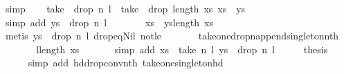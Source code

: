 \begin{isabellebody}
\ simp\isanewline
\ \ \isamarkupfalse%
\ {\isachardoublequoteopen}take\ {}\ {\isacharparenleft}drop\ n\ l{\isacharparenright}\ {\isacharequal}\ take\ {}\ {\isacharparenleft}drop\ {\isacharparenleft}length\ xs{\isacharparenright}\ {\isacharparenleft}xs\ {\isacharat}\ ys{\isacharparenright}{\isacharparenright}{\isachardoublequoteclose}\ \isamarkupfalse%
\ {}\ {}\ \isanewline
\ \ \ \ \isamarkupfalse%
\ {\isacharparenleft}simp\ add{\isacharcolon}\ {\isacharbackquoteopen}ys\ {\isacharequal}\ drop\ n\ l{\isacharbackquoteclose}{\isacharparenright}\isanewline
\ \ \isamarkupfalse%
\ \isamarkupfalse%
\ {\isachardoublequoteopen}{\isachardot}{\isachardot}{\isachardot}\ {\isacharequal}\ {\isacharbrackleft}{\isacharparenleft}xs\ {\isacharat}\ ys{\isacharparenright}{\isacharbang}{\isacharparenleft}length\ xs{\isacharparenright}{\isacharbrackright}{\isachardoublequoteclose}\ \isamarkupfalse%
\ {}\ {}\isanewline
\ \ \ \ \isamarkupfalse%
\ {\isacharparenleft}metis\ {\isacharbackquoteopen}ys\ {\isacharequal}\ drop\ n\ l{\isacharbackquoteclose}\ drop{\isacharunderscore}eq{\isacharunderscore}Nil\ not{\isacharunderscore}le\ \isanewline
\ \ \ \ \ \ take{\isacharunderscore}one{\isacharunderscore}drop{\isacharunderscore}n{\isacharunderscore}append{\isacharunderscore}singleton{\isacharunderscore}nth{\isacharparenright}\isanewline
\ \ \isamarkupfalse%
\ \isamarkupfalse%
\ {\isachardoublequoteopen}{\isachardot}{\isachardot}{\isachardot}\ {\isacharequal}\ {\isacharbrackleft}l{\isacharbang}{\isacharparenleft}length\ xs{\isacharparenright}{\isacharbrackright}{\isachardoublequoteclose}\ \isanewline
\ \ \ \ \isamarkupfalse%
\ {\isacharparenleft}simp\ add{\isacharcolon}\ {\isacharbackquoteopen}xs\ {\isacharequal}\ take\ n\ l{\isacharbackquoteclose}\ {\isacharbackquoteopen}ys\ {\isacharequal}\ drop\ n\ l{\isacharbackquoteclose}{\isacharparenright}\isanewline
\ \ \isamarkupfalse%
\ \isamarkupfalse%
\ {\isacharquery}thesis\ \isamarkupfalse%
\ {}\ {}\isanewline
\ \ \ \ \isamarkupfalse%
\ {\isacharparenleft}simp\ add{\isacharcolon}\ hd{\isacharunderscore}drop{\isacharunderscore}conv{\isacharunderscore}nth\ take{\isacharunderscore}one{\isacharunderscore}singleton{\isacharunderscore}hd{\isacharparenright}\isanewline
{}\isamarkupfalse%
%
\endisatagproof
{\isafoldproof}%

\end{isabellebody}
